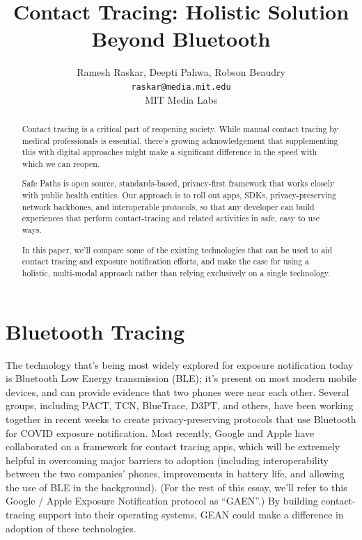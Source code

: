 \documentclass[11pt]{article}
\begin{document}
\title{Contact Tracing: Holistic Solution Beyond Bluetooth}
%
\author{Ramesh Raskar, Deepti Pahwa, Robson Beaudry \\
{\small \texttt{raskar@media.mit.edu}}\\
MIT Media Labs
}


\maketitle

\begin{abstract}
Contact tracing is a critical part of reopening society. While manual contact tracing by medical professionals is essential, there’s growing acknowledgement that supplementing this with digital approaches might make a significant difference in the speed with which we can reopen.
 
Safe Paths is open source, standards-based, privacy-first framework that works closely with public health entities. Our approach is to roll out apps, SDKs, privacy-preserving network backbones, and interoperable protocols, so that any developer can build experiences that perform contact-tracing and related activities in safe, easy to use ways.

In this paper, we’ll compare some of the existing technologies that can be used to aid contact tracing and exposure notification efforts, and make the case for using a holistic, multi-modal approach rather than relying exclusively on a single technology.
\end{abstract}

\section{Bluetooth Tracing}

The technology that’s being most widely explored for exposure notification today is Bluetooth Low Energy transmission (BLE); it’s present on most modern mobile devices, and can provide evidence that two phones were near each other. Several groups, including PACT, TCN, BlueTrace, D3PT, and others, have been working together in recent weeks to create privacy-preserving protocols that use Bluetooth for COVID exposure notification. Most recently, Google and Apple have collaborated on a framework for contact tracing apps, which will be extremely helpful in overcoming major barriers to adoption (including interoperability between the two companies’ phones, improvements in battery life, and allowing the use of BLE in the background). (For the rest of this essay, we’ll refer to this Google / Apple Exposure Notification protocol as “GAEN”.) By building contact-tracing support into their operating systems, GEAN could make a difference in adoption of these technologies.
\end{document}
